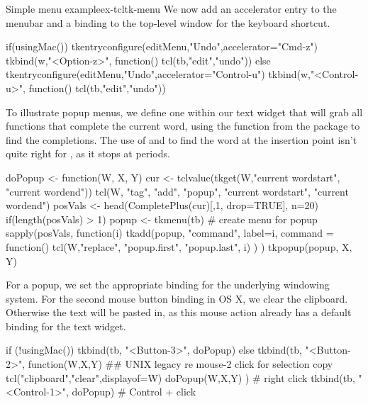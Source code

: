 \begin{example}{Simple menu example}{ex-tcltk-menu}
We now add an accelerator entry to the menubar and a binding to the top-level window for the keyboard shortcut.
\begin{Schunk}
\begin{Sinput}
 if(usingMac()) {
   tkentryconfigure(editMenu,"Undo",accelerator="Cmd-z")
   tkbind(w,"<Option-z>", function() tcl(tb,"edit","undo"))
 } else {
   tkentryconfigure(editMenu,"Undo",accelerator="Control-u")
   tkbind(w,"<Control-u>", function() tcl(tb,"edit","undo"))
 }
\end{Sinput}
\end{Schunk}

To illustrate popup menus, we define one within our text widget that will grab all
functions that complete the current word, using the
 function from the  package to find
the completions.  The use of  and
 to find the word at the insertion point isn't quite
right for \R, as it stops at periods.
\begin{Schunk}
\begin{Sinput}
 doPopup <- function(W, X, Y) {
   cur <- tclvalue(tkget(W,"current  wordstart", "current wordend"))
   tcl(W, "tag", "add", "popup", "current  wordstart", "current wordend")
   posVals <- head(CompletePlus(cur)[,1, drop=TRUE], n=20)
   if(length(posVals) > 1) {
     popup <- tkmenu(tb)                 # create menu for popup
     sapply(posVals, function(i) {         
       tkadd(popup, "command", label=i, command = function() {
         tcl(W,"replace", "popup.first", "popup.last", i)
       })
     })
     tkpopup(popup, X, Y)
  }}
\end{Sinput}
\end{Schunk}

For a popup, we set the appropriate binding for the underlying
windowing system. For the second mouse button binding in OS X, we
clear the clipboard. Otherwise the text  will be pasted in, as this mouse
action already has a default binding for the text widget.

\begin{Schunk}
\begin{Sinput}
 if (!usingMac()) {
   tkbind(tb, "<Button-3>", doPopup)
 } else {
   tkbind(tb, "<Button-2>", function(W,X,Y) {
     ## UNIX legacy re mouse-2 click for selection copy
     tcl("clipboard","clear",displayof=W) 
     doPopup(W,X,Y)
     })      # right click
   tkbind(tb, "<Control-1>", doPopup)     # Control + click
 }
\end{Sinput}
\end{Schunk}
\end{example}

